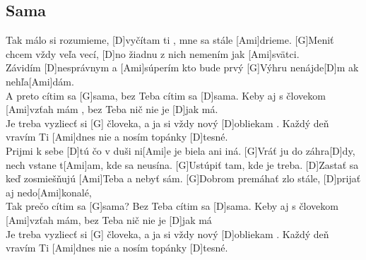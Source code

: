 \documentclass[10pt]{article}
\begin{document}
\begin{Large}
\begin{minipage}{\textwidth}
\subsection{Sama}
\begin{multicols}{2}
\begin{guitar}
	[G]Tak málo si rozumieme,
	[D]vyčítam ti , mne sa stále [Ami]drieme.
	[G]Meniť chcem vždy veľa vecí,
	[D]no žiadnu z nich nemením jak [Ami]svätci.
	\\
	[G]Závidím [D]nesprávnym 
	a [Ami]súperím kto bude prvý
	[G]Výhru nenájde[D]m ak nehľa[Ami]dám.
	\\
	A preto cítim sa [G]sama,
	bez Teba cítim sa [D]sama.
	Keby aj s človekom [Ami]vzťah mám ,
	bez Teba nič nie je [D]jak má.
	\\
	Je treba vyzliecť si [G] človeka,
	a ja si vždy nový [D]obliekam .
	Každý deň vravím Ti [Ami]dnes nie
	a nosím topánky [D]tesné.
	\\
	[G]Prijmi k sebe [D]tú čo v duši ni[Ami]e
	 je biela ani iná.
	[G]Vráť ju do záhra[D]dy, nech vstane t[Ami]am, 
	kde sa neusína.
	[G]Ustúpiť tam, kde je treba.
	[D]Zastať sa keď zosmiešňujú [Ami]Teba 
	a nebyť sám.
	[G]Dobrom premáhať zlo stále, [D]prijať aj
	 nedo[Ami]konalé,
	\\
	Tak prečo cítim sa [G]sama?
	Bez Teba cítim sa [D]sama.
	Keby aj s človekom [Ami]vzťah mám, 
	bez Teba nič nie je [D]jak má
	\\
	Je treba vyzliecť si [G] človeka,
	a ja si vždy nový [D]obliekam .
	Každý deň vravím Ti [Ami]dnes nie
	a nosím topánky [D]tesné.
\end{guitar}
\end{multicols}
\end{minipage}

\begin{minipage}{\textwidth}

\end{minipage}
\end{Large}
\end{document}
